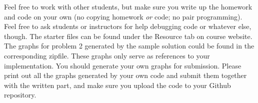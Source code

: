 \documentclass[12pt,letterpaper,fleqn]{hmcpset}
\begin{document}
\newcommand{\muu}{\boldsymbol{\mu}}
Feel free to work with other students, but make sure you write up the homework
and code on your own (no copying homework \textit{or} code; no pair programming).
Feel free to ask students or instructors for help debugging code or whatever else,
though.
\newline
\newline
The starter files can be found under the Resource tab on course website. The graphs for problem 2 generated by the sample solution could be found in the corresponding zipfile. These graphs only serve as references to your implementation. You should generate your own graphs for submission. Please print out all the graphs generated by your own code and submit them together with the written part, and make sure you upload the code to your Github repository.
\end{document}
